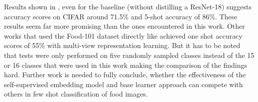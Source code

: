 Results shown in \cite{tian_rethinking_2020}, even for the baseline (without distilling a ResNet-18) suggests accuracy 
scores on CIFAR around 71.5\% and 5-shot accuracy of 86\%. These results seem far more promising than the 
ones encountered in this work. Other works that used the Food-101 dataset directly like \cite{jiang_few-shot_2020} achieved
one shot accuracy scores of 55\% with multi-view representation learning. 
But it has to be noted that tests were only performed on five randomly sampled classes \cite{jiang_few-shot_2020}
instead of the 15 or 16 classes that were used in this work making the comparison of the findings hard.
Further work is needed to fully conclude, whether the effectiveness of the self-supervised embedding model
and base learner approach can compete with others in few shot classification of food images.
